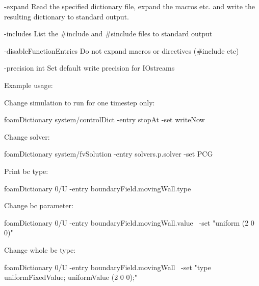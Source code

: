 \begin{DoxyItemize}
\item \begin{DoxyParagraph}{-\/expand}
Read the specified dictionary file, expand the macros etc. and write the resulting dictionary to standard output.
\end{DoxyParagraph}

\item \begin{DoxyParagraph}{-\/includes}
List the {\ttfamily \#include} and {\ttfamily \#sinclude} files to standard output
\end{DoxyParagraph}

\item \begin{DoxyParagraph}{-\/disable\+Function\+Entries}
Do not expand macros or directives (\#include etc)
\end{DoxyParagraph}

\item \begin{DoxyParagraph}{-\/precision int}
Set default write precision for I\+Ostreams
\end{DoxyParagraph}
Example usage\+:
\item Change simulation to run for one timestep only\+: \begin{DoxyVerb}      foamDictionary system/controlDict -entry stopAt -set writeNow\end{DoxyVerb}

\item Change solver\+: \begin{DoxyVerb}       foamDictionary system/fvSolution -entry solvers.p.solver -set PCG\end{DoxyVerb}

\item Print bc type\+: \begin{DoxyVerb}       foamDictionary 0/U -entry boundaryField.movingWall.type\end{DoxyVerb}

\item Change bc parameter\+: \begin{DoxyVerb}       foamDictionary 0/U -entry boundaryField.movingWall.value \
         -set "uniform (2 0 0)"\end{DoxyVerb}

\item Change whole bc type\+: \begin{DoxyVerb}      foamDictionary 0/U -entry boundaryField.movingWall \
        -set "{type uniformFixedValue; uniformValue (2 0 0);}"\end{DoxyVerb}


\end{DoxyItemize}
